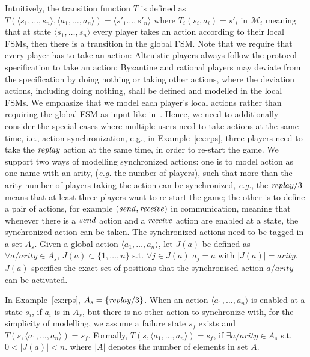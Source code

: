 Intuitively, the transition function $T$ is defined as
$T(\langle s_1,\ldots, s_n\rangle, \langle a_1, \ldots, a_n\rangle)=\langle s'_1 \ldots, s'_n\rangle$
where $T_i(s_i, a_i)=s'_i$ in $\mathcal{M}_i$ meaning that
at state $\langle s_1,\ldots, s_n\rangle$ every player takes an action according
to their local FSMs, then there is a transition in the global FSM. Note that we require
that every player has to take an action: Altruistic players always follow the protocol specification to take an action;
Byzantine and rational players may deviate from the specification by doing nothing or taking other actions, where
the deviation actions, including doing nothing, shall be defined and modelled in the local FSMs. 
We emphasize that we model each player's local actions rather than
requiring the global FSM as input like in~\cite{MMSTACL08}. Hence, we need to additionally consider the 
special cases where multiple users need to take actions at the same time, i.e., action synchronization,
e.g., in Example~\ref{ex:rps}, three players need to take the $\mathit{replay}$ action at the same time, in order
to re-start the game. We support two ways of modelling synchronized actions: one
is to model action as one name with an arity, (\emph{e.g.} the number of players), such that more than the arity number of players taking the action can be synchronized, \emph{e.g.}, 
the $\mathit{replay}/3$ means that at least three players want to re-start the game;
the other is to define a pair of actions, for example $(\mathit{send}, \mathit{receive})$ in communication,
meaning that whenever there is a $\mathit{send}$ action and a $\mathit{receive}$ action are enabled at a state,
the synchronized action can be taken. The synchronized actions need to be tagged in a
set $A_s$. Given a global action $\langle a_1, \ldots, a_n\rangle$, let $J(a)$ be defined as \\
$\forall a/arity \in A_s$, $J(a) \subset \{1, \dots ,n\}$ s.t. $\forall j \in J(a)$ $a_j=a$ with $|J(a)|=arity$. $J(a)$ specifies the exact set of positions that the synchronised action $a/arity$ can be activated.

In Example~\ref{ex:rps}, $A_s=\{\mathit{replay}/3\}$. When an action $\langle a_1, \ldots, a_n\rangle$ 
is enabled at a state $s_i$, if $a_i$ is in $A_s$, but there is no other action to synchronize with, for the simplicity 
of modelling, we assume a failure state $s_f$ exists and $T(s, \langle a_1, \ldots, a_n\rangle)=s_f$. 
 Formally,
$T(s, \langle a_1, \ldots, a_n\rangle)=s_f$, if 
$\exists a/arity \in A_s$ s.t. $0 < |J(a)| < n$.
where $|A|$ denotes the number of elements in set $A$.

